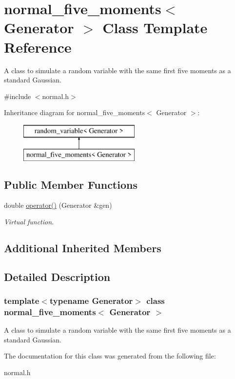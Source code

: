 \hypertarget{classnormal__five__moments}{}\section{normal\+\_\+five\+\_\+moments$<$ Generator $>$ Class Template Reference}
\label{classnormal__five__moments}


A class to simulate a random variable with the same first five moments as a standard Gaussian.  




{\ttfamily \#include $<$normal.\+h$>$}

Inheritance diagram for normal\+\_\+five\+\_\+moments$<$ Generator $>$\+:\begin{figure}[H]
\begin{center}
\leavevmode
\includegraphics[height=2.000000cm]{classnormal__five__moments}
\end{center}
\end{figure}
\subsection*{Public Member Functions}
\begin{DoxyCompactItemize}
\item 
\mbox{\label{classnormal__five__moments_adca4add1bfd8ea199bd63c80ab48b2d1}} 
double \mbox{\hyperlink{classnormal__five__moments_adca4add1bfd8ea199bd63c80ab48b2d1}{operator()}} (Generator \&gen)
\begin{DoxyCompactList}\small\item\em Virtual function. \end{DoxyCompactList}\end{DoxyCompactItemize}
\subsection*{Additional Inherited Members}


\subsection{Detailed Description}
\subsubsection*{template$<$typename Generator$>$\newline
class normal\+\_\+five\+\_\+moments$<$ Generator $>$}

A class to simulate a random variable with the same first five moments as a standard Gaussian. 

The documentation for this class was generated from the following file\+:\begin{DoxyCompactItemize}
\item 
normal.\+h\end{DoxyCompactItemize}
